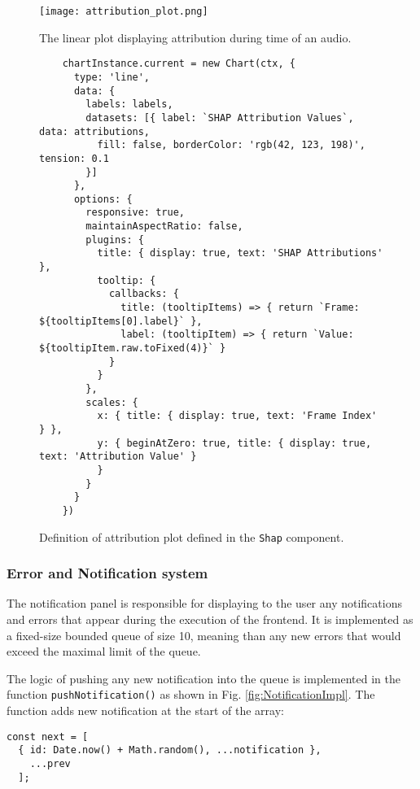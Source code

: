 \documentclass[
    bindingoffset=5mm,  %
    footnoteindent=3mm, %
    hyphenation=true    %
]{src/wut-thesis}
\begin{document}
\begin{figure}[h!] %
    \centering
    \texttt{[image: attribution\_plot.png]}
    \caption{The linear plot displaying attribution during time of an audio.}
    \label{fig:AttrPlot}
\end{figure}

\begin{figure}%
\begin{verbatim}
    chartInstance.current = new Chart(ctx, {
      type: 'line',
      data: {
        labels: labels,
        datasets: [{ label: `SHAP Attribution Values`, data: attributions,
          fill: false, borderColor: 'rgb(42, 123, 198)', tension: 0.1
        }]
      },
      options: {
        responsive: true,
        maintainAspectRatio: false,
        plugins: {
          title: { display: true, text: 'SHAP Attributions' },
          tooltip: {
            callbacks: {
              title: (tooltipItems) => { return `Frame: ${tooltipItems[0].label}` },
              label: (tooltipItem) => { return `Value: ${tooltipItem.raw.toFixed(4)}` }
            }
          }
        },
        scales: {
          x: { title: { display: true, text: 'Frame Index' } },
          y: { beginAtZero: true, title: { display: true, text: 'Attribution Value' }
          }
        }
      }
    })
\end{verbatim}
\caption{Definition of attribution plot defined in the \texttt{Shap} component.}
\label{fig:ShapAttrPlot}
\end{figure}

\subsubsection{Error and Notification system}

The notification panel is responsible for displaying to the user any notifications
and errors that appear during the execution of the frontend. It is implemented as
a fixed-size bounded queue of size 10, meaning than any new errors that would exceed
the maximal limit of the queue.

The logic of pushing any new notification into the queue is implemented in the function
\texttt{pushNotification()} as shown in Fig. \ref{fig:NotificationImpl}.
The function adds new notification at the start of the array:

\begin{verbatim}
const next = [
  { id: Date.now() + Math.random(), ...notification },
    ...prev
  ];
\end{verbatim}
\end{document}
